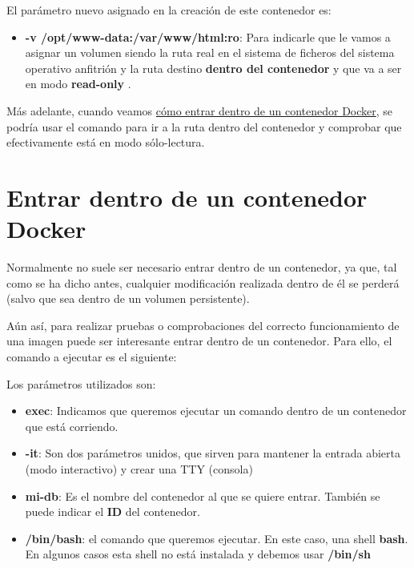 El parámetro nuevo asignado en la creación de este contenedor es:
\begin{itemize}
    \item \textbf{-v /opt/www-data:/var/www/html:ro}: Para indicarle que le vamos a asignar un volumen siendo la ruta real en el sistema de ficheros del sistema operativo anfitrión  y la ruta destino \textbf{dentro del contenedor} y que va a ser en modo \textbf{read-only} .
\end{itemize}

Más adelante, cuando veamos \hyperlink{entrar_en_contenedor}{cómo entrar dentro de un contenedor Docker}, se podría usar el comando para ir a la ruta dentro del contenedor y comprobar que efectivamente está en modo sólo-lectura.

\hypertarget{entrar_en_contenedor}{}
\section{Entrar dentro de un contenedor Docker}
Normalmente no suele ser necesario entrar dentro de un contenedor, ya que, tal como se ha dicho antes, cualquier modificación realizada dentro de él se perderá (salvo que sea dentro de un volumen persistente).

Aún así, para realizar pruebas o comprobaciones del correcto funcionamiento de una imagen puede ser interesante entrar dentro de un contenedor. Para ello, el comando a ejecutar es el siguiente:


Los parámetros utilizados son:
\begin{itemize}
    \item \textbf{exec}: Indicamos que queremos ejecutar un comando dentro de un contenedor que está corriendo.
    \item \textbf{-it}: Son dos parámetros unidos, que sirven para mantener la entrada abierta (modo interactivo) y crear una TTY (consola)
    \item \textbf{mi-db}: Es el nombre del contenedor al que se quiere entrar. También se puede indicar el \textbf{ID} del contenedor.
    \item \textbf{/bin/bash}: el comando que queremos ejecutar. En este caso, una shell \textbf{bash}. En algunos casos esta shell no está instalada y debemos usar \textbf{/bin/sh}
\end{itemize}

